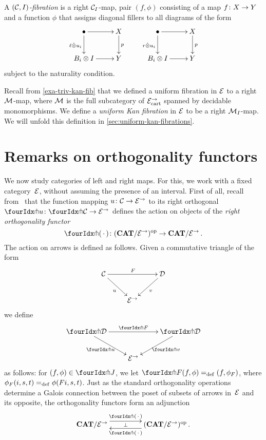 \documentclass[reqno,10pt,a4paper,oneside]{amsart}
\begin{document}
\begin{definition} A \emph{$(\cal{C}, \interval)$-fibration} is a right $\cal{C}_\interval$-map, \ie pair $(f, \phi)$ consisting of a map $f \co X \to Y$ and a function $\phi$ that assigns diagonal fillers to all diagrams of the form
\[
\xymatrix{
\bullet \ar[r] \ar[d]_{\intervall \hatotimes u_i} & X \ar[d]^p \\
B_i \otimes \interval \ar[r] & Y} \qquad \xymatrix{
\bullet \ar[r] \ar[d]_{\intervalr \hatotimes u_i} & X \ar[d]^p \\
B_i \otimes \interval \ar[r] & Y}
\]
subject to the naturality condition. 
\end{definition}


\begin{example} Recall from \cref{exa-triv-kan-fib} that we defined a uniform  fibration in
$\cal{E}$ to a right $\cal{M}$-map, where $\cal{M}$ is the full subcategory of $\cal{E}^\to_\cart$
spanned by decidable monomorphisms. We define a \emph{uniform Kan fibration} in $\cal{E}$
to be a right $\cal{M}_{I}$-map. We will unfold this definition in \cref{sec:uniform-kan-fibrations}.  
 \end{example} 
  


\section{Remarks on orthogonality functors} 
\label{sec-orthog-functors}

We now study categories of left and right maps. For this, we work with a fixed category~$\catE$, without assuming the presence of an interval. First of all, recall from~\cite{garner:small-object-argument} that the function mapping $u \co \cal{C} \to \catE^\to$ to its right orthogonal $\liftr{u} \co \liftr{\cal{C}} \to \cal{E}^\to$ defines the action on objects of the \emph{right orthogonality functor}
\[
\liftr{\brarghole} \co  (\CAT/\catE^{\to})^{\op} \to \CAT/\catE^{\to} \, .
\]
The action  on arrows is defined as follows. Given a commutative triangle of the form
\[
\xymatrix{
\cal{C} \ar[dr]_u \ar[rr]^F & & \cal{D} \ar[dl]^{v} \\
 & \catE^\to }
 \]
we define 
\[
\xymatrix{
\liftr{\cal{D}} \ar[dr]_{\liftr{u}} \ar[rr]^{\liftr{F}} & & \liftr{\cal{D}} \ar[dl]^{\liftr{v}} \\
 & \catE^\to }
\]
as follows: for $(f, \phi) \in \liftr{J}$, we let $\liftr{F}(f,\phi) \defeq (f, \phi_F)$, where $\phi_F(i, s, t) \defeq \phi(Fi, s, t)$. 
Just as the standard orthogonality operations determine a Galois connection between the poset of subsets of arrows in~$\catE$ and its opposite, the orthogonality functors form an adjunction 
\begin{equation}
\label{garner-adjunction}
\begin{gathered}
\xymatrix@C+2em{
  \CAT/\catE^{\to}
  \ar@<5pt>[r]^-{\liftl{\brarghole}}
  \ar@{}[r]|-{\bot}
&
  (\CAT/\catE^{\to})^{\op} \, .
  \ar@<5pt>[l]^-{\liftr{\brarghole}}
}
\end{gathered}
\end{equation}
\end{document}
